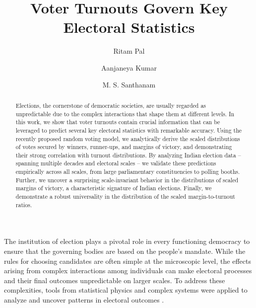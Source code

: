 \documentclass[reprint, pre, twocolumn, aps, showpacs, superscriptaddress]{revtex4-2}
\begin{document}
\title{Voter Turnouts Govern Key Electoral Statistics}

\author{Ritam Pal}
\author{Aanjaneya Kumar}
\author{M. S. Santhanam}


\begin{abstract}
Elections, the cornerstone of democratic societies, are usually regarded as unpredictable due to the complex interactions that shape them at different levels. In this work, we show that voter turnouts contain crucial information that can be leveraged to predict several key electoral statistics with remarkable accuracy. Using the recently proposed random voting model, we analytically derive the scaled distributions of votes secured by winners, runner-ups, and margins of victory, and demonstrating their strong correlation with turnout distributions. By analyzing Indian election data -- spanning multiple decades and electoral scales -- we validate these predictions empirically across all scales, from large parliamentary constituencies to polling booths. Further, we uncover a surprising scale-invariant behavior in the distributions of scaled margins of victory, a characteristic signature of Indian elections. Finally, we demonstrate a robust universality in the distribution of the scaled margin-to-turnout ratios.
\end{abstract}

\maketitle

The institution of election plays a pivotal role in every functioning democracy to ensure that the governing bodies are based on the people's mandate. While the rules for choosing candidates are often simple at the microscopic level, the effects arising from complex interactions among individuals can make electoral processes and their final outcomes unpredictable on larger scales. To address these complexities, tools from statistical physics and complex systems were applied to analyze and uncover patterns in electoral outcomes \cite{galam1999application, gelman2002mathematics, brams2008, CasForLor2009, galam2012, ForMacRed2013, SenCha2014, FerSucRam2014, BraDeA2017, Kon2019, redner2019reality, MigTor2020}.
\end{document}
